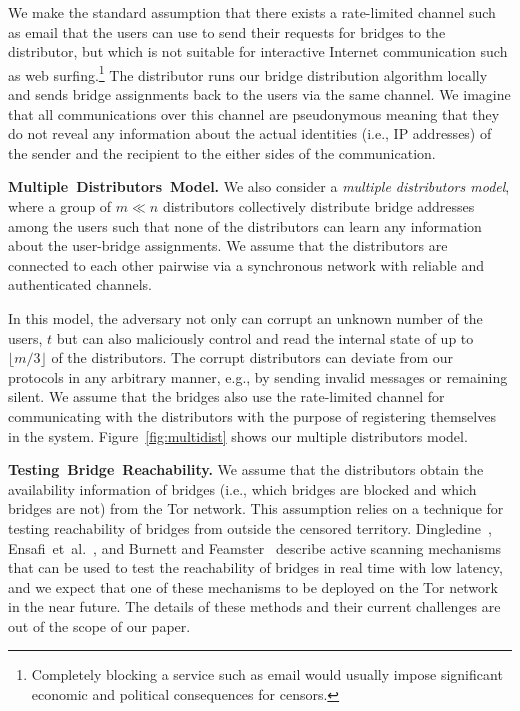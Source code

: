 \documentclass[letterpaper,twocolumn,10pt]{article}
\newcommand{\fullpaper}[1]{#1}
\newcommand{\fullpaper}[1]{}
\newcommand{\etal}{et~al.}
\newcommand{\eg}{e.g.}
\newcommand{\sfsize}{\fontsize{0.68\baselineskip}{0.68\baselineskip}\selectfont}
\newcommand{\sans}[1]{\textbf{\textsf{\sfsize \mbox{#1}}}}
\newcommand{\para}[1]{\vspace{0.55em} \noindent \sans{{\mbox{#1}}}}
\begin{document}
We make the standard assumption that there exists a rate-limited channel such as email that the users can use to send their requests for bridges to the distributor, but which is not suitable for interactive Internet communication such as web surfing.\footnote{Completely blocking a service such as email would usually impose significant economic and political consequences for censors.} The distributor runs our bridge distribution algorithm locally and sends bridge assignments back to the users via the same channel. \fullpaper{We imagine that all communications over this channel are pseudonymous meaning that they do not reveal any information about the actual identities (i.e., IP addresses) of the sender and the recipient to the either sides of the communication.}

\para{Multiple Distributors Model.} 
We also consider a \emph{multiple distributors model}, where a group of \mbox{$m \ll n$} distributors collectively distribute bridge addresses among the users such that none of the distributors can learn any information about the user-bridge assignments. We assume that the distributors are connected to each other pairwise via a synchronous network with reliable and authenticated channels.

In this model, the adversary not only can corrupt an unknown number of the users, $t$ but can also maliciously control and read the internal state of up to $\lfloor m/3 \rfloor$ of the distributors. The corrupt distributors can deviate from our protocols in any arbitrary manner, \eg, by sending invalid messages or remaining silent. 
We assume that the bridges also use the rate-limited channel for communicating with the distributors with the purpose of registering themselves in the system. Figure~\ref{fig:multidist} shows our multiple distributors model.

\para{Testing Bridge Reachability.} We assume that the distributors obtain the availability information of bridges (i.e., which bridges are blocked and which bridges are not) from the Tor network. This assumption relies on a technique for testing reachability of bridges from outside the censored territory. Dingledine~\cite{Dingledine:BridgeReach:2011}, Ensafi~\etal~\cite{Ensafi:2014:PAM}, and Burnett and Feamster~\cite{Burnett:2015:ELM} describe active scanning mechanisms that can be used to test the reachability of bridges in real time with low latency, and we expect that one of these mechanisms to be deployed on the Tor network in the near future. The details of these methods and their current challenges are out of the scope of our paper.
\end{document}
